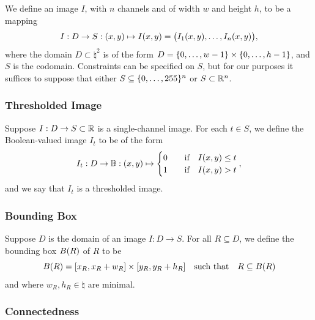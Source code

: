 \documentclass{article}
\begin{document}
We define an image $I$, with $n$ channels and of width $w$ and height $h$, to be
a mapping
\begin{equation}
  \label{eq:def-image}
  I
  :
  D \to S
  :
  \lr{x, y}
  \mapsto
  I\lr{x, y}
  =
  \lr[\big]
  {
    I_{1}\lr{x, y}
    ,
    \dotsc
    ,
    I_{n}\lr{x, y}
  }
  ,
\end{equation}
where the domain $D \subset \natural^{2}$ is of the form
$D = \lbrace0, \dotsc, w - 1\rbrace \times \lbrace0, \dotsc, h - 1\rbrace$, and $S$ is the
codomain.
Constraints can be specified on $S$, but for our purposes it suffices to suppose
that either $S \subseteq \lbrace0, \dotsc, 255\rbrace^{n}$ or $S \subset \mathbb{R}^{n}$.

\subsubsection*{Thresholded Image}

Suppose $I : D \to S \subset \mathbb{R}$ is a single-channel image.
For each $t \in S$, we define the Boolean-valued image $I_{t}$ to be of the
form
\begin{equation}
  \label{eq:def-image-threshold}
  I_{t}
  :
  D \to \mathbb{B}
  :
  \lr{x, y}
  \mapsto
  \begin{cases}
    0
    &\qq{if}
    I\lr{x, y} \leq t
    \\
    1
    &\qq{if}
    I\lr{x, y} > t
  \end{cases}
  ,
\end{equation}
and we say that $I_{t}$ is a thresholded image.


\subsubsection*{Bounding Box}

Suppose $D$ is the domain of an image $I : D \to S$.
For all $R \subseteq D$, we define the bounding box $B(R)$ of $R$ to be
\begin{equation}
  \label{eq:def-bounding-box}
  B\lr{R}
  =
  \lrsq{x_{R}, x_{R} + w_{R}}
  \times
  \lrsq{y_{R}, y_{R} + h_{R}}
  \qq{such that}
  R \subseteq B\lr{R}
\end{equation}
and where $w_{R}, h_{R} \in \natural$ are minimal.

\subsubsection*{Connectedness}
\end{document}
